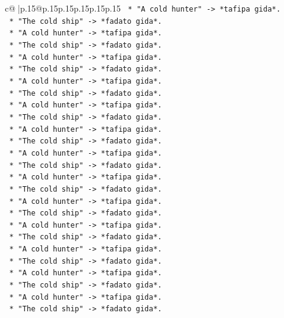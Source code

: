 \documentclass{article}
\begin{document}
{\begin{supertabular}{c@{$\;$}|p{.15\linewidth}@{}p{.15\linewidth}p{.15\linewidth}p{.15\linewidth}p{.15\linewidth}p{.15\linewidth}}
{{{\texttt{        *   "A cold hunter" {-}> *tafipa gida*.} \\
\texttt{        *   "The cold ship" {-}> *fadato gida*.} \\
\texttt{        *   "A cold hunter" {-}> *tafipa gida*.} \\
\texttt{        *   "The cold ship" {-}> *fadato gida*.} \\
\texttt{        *   "A cold hunter" {-}> *tafipa gida*.} \\
\texttt{        *   "The cold ship" {-}> *fadato gida*.} \\
\texttt{        *   "A cold hunter" {-}> *tafipa gida*.} \\
\texttt{        *   "The cold ship" {-}> *fadato gida*.} \\
\texttt{        *   "A cold hunter" {-}> *tafipa gida*.} \\
\texttt{        *   "The cold ship" {-}> *fadato gida*.} \\
\texttt{        *   "A cold hunter" {-}> *tafipa gida*.} \\
\texttt{        *   "The cold ship" {-}> *fadato gida*.} \\
\texttt{        *   "A cold hunter" {-}> *tafipa gida*.} \\
\texttt{        *   "The cold ship" {-}> *fadato gida*.} \\
\texttt{        *   "A cold hunter" {-}> *tafipa gida*.} \\
\texttt{        *   "The cold ship" {-}> *fadato gida*.} \\
\texttt{        *   "A cold hunter" {-}> *tafipa gida*.} \\
\texttt{        *   "The cold ship" {-}> *fadato gida*.} \\
\texttt{        *   "A cold hunter" {-}> *tafipa gida*.} \\
\texttt{        *   "The cold ship" {-}> *fadato gida*.} \\
\texttt{        *   "A cold hunter" {-}> *tafipa gida*.} \\
\texttt{        *   "The cold ship" {-}> *fadato gida*.} \\
\texttt{        *   "A cold hunter" {-}> *tafipa gida*.} \\
\texttt{        *   "The cold ship" {-}> *fadato gida*.} \\
\texttt{        *   "A cold hunter" {-}> *tafipa gida*.} \\
\texttt{        *   "The cold ship" {-}> *fadato gida*.} \\
}}}
\end{supertabular}}
\end{document}
